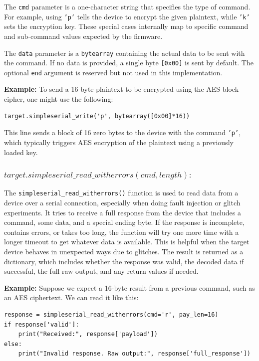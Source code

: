 The \texttt{cmd} parameter is a one-character string that specifies the type of command. For example, using \texttt{'p'} tells the device to encrypt the given plaintext, while \texttt{'k'} sets the encryption key. These special cases internally map to specific command and sub-command values expected by the firmware.

The \texttt{data} parameter is a \texttt{bytearray} containing the actual data to be sent with the command. If no data is provided, a single byte \texttt{[0x00]} is sent by default. The optional \texttt{end} argument is reserved but not used in this implementation.

\vspace{0.3cm}
\noindent
\textbf{Example:} To send a 16-byte plaintext to be encrypted using the AES block cipher, one might use the following:

\begin{verbatim}
target.simpleserial_write('p', bytearray([0x00]*16))
\end{verbatim}

This line sends a block of 16 zero bytes to the device with the command \texttt{'p'}, which typically triggers AES encryption of the plaintext using a previously loaded key.

\subsubsection{$target.simpleserial\_read\_witherrors(cmd, length) :$}
The \texttt{simpleserial\_read\_witherrors()} function is used to read data from a device over a serial connection, especially when doing fault injection or glitch experiments. It tries to receive a full response from the device that includes a command, some data, and a special ending byte. If the response is incomplete, contains errors, or takes too long, the function will try one more time with a longer timeout to get whatever data is available. This is helpful when the target device behaves in unexpected ways due to glitches. The result is returned as a dictionary, which includes whether the response was valid, the decoded data if successful, the full raw output, and any return values if needed.

\vspace{0.3cm}
\noindent
\textbf{Example:} Suppose we expect a 16-byte result from a previous command, such as an AES ciphertext. We can read it like this:

\begin{verbatim}
response = simpleserial_read_witherrors(cmd='r', pay_len=16)
if response['valid']:
    print("Received:", response['payload'])
else:
    print("Invalid response. Raw output:", response['full_response'])
\end{verbatim}


